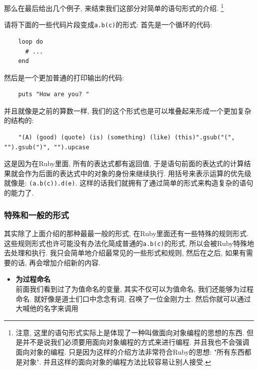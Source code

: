 那么在最后给出几个例子, 来结束我们这部分对简单的语句形式的介绍. \footnote{注意, 这里的语句形式实际上是体现了一种叫做面向对象编程的思想的东西. 但是并不是说我们必须要用面向对象编程的方式来进行编程. 并且我也不会强调面向对象的编程. 只是因为这样的介绍方法非常符合Ruby的思想: "所有东西都是对象". 并且这样的面向对象的编程方法比较容易让别人接受. }

\begin{example}
  请将下面的一些代码片段变成\texttt{a.b(c)}的形式: 
  首先是一个循环的代码: 
  \begin{verbatim}
    loop do
      # ...
    end
  \end{verbatim}
  
  然后是一个更加普通的打印输出的代码: 
  \begin{verbatim}
    puts "How are you? "
  \end{verbatim}

  并且就像是之前的算数一样, 我们的这个形式也是可以堆叠起来形成一个更加复杂的结构的: 
  \begin{verbatim}
    "(A) (good) (quote) (is) (something) (like) (this)".gsub("(", "").gsub(")", "").upcase
  \end{verbatim}

  这是因为在Ruby里面, 所有的表达式都有返回值, 于是语句前面的表达式的计算结果就会作为后面的表达式中的对象的身份来继续执行. 用括号来表示运算的优先级就像是: \texttt{(a.b(c)).d(e)}. 这样的话我们就拥有了通过简单的形式来构造复杂的语句的能力了. 
\end{example}

\subsubsection{特殊和一般的形式}
其实除了上面介绍的那种最最一般的形式, 在Ruby里面还有一些特殊的规则形式. 这些规则形式也许可能没有办法化简成普通的\texttt{a.b(c)}的形式, 所以会被Ruby特殊地去处理和执行. 我只会简单地介绍最常见的一些形式和规则, 然后在之后, 如果有需要的话, 再会增加介绍新的内容. 

\begin{itemize}
  \item \textbf{为过程命名}\\
  前面我们看到过了为值命名的变量, 其实不仅可以为值命名, 我们还能够为过程命名. 就好像是道士们口中念念有词, 召唤了一位金刚力士. 然后你就可以通过大喊他的名字来调用
\end{itemize}

